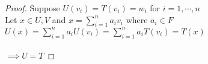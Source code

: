 \begin{proof}
	Suppose $U(v_i)=T(v_i)=w_i$ for $i=1,\cdots,n$ \\
Let $x \in U,V$ and $x = \sum^n_{i=1}a_iv_i$ where $a_i \in F$ \\
$U(x) = \sum^n_{i=1}a_iU(v_i) = \sum^n_{i=1}a_iT(v_i)=T(x)$ \\
\\$\implies U=T$
\end{proof}

